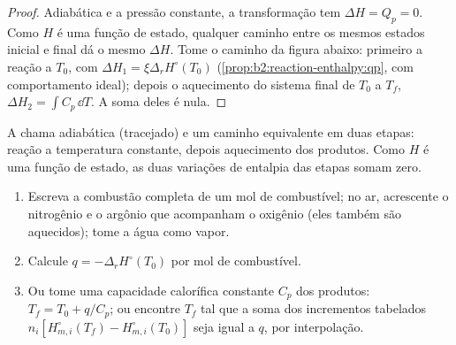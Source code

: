 \begin{proof}
Adiabática e a pressão constante, a transformação tem $\Delta H =
Q_p = 0$. Como $H$ é uma função de estado, qualquer caminho entre os mesmos
estados inicial e final dá o mesmo $\Delta H$. Tome o caminho da
figura abaixo: primeiro a reação a $T_0$, com
$\Delta H_1 = \xi\Delta_r H^\circ(T_0)$ (\cref{prop:b2:reaction-enthalpy:qp},
com comportamento ideal); depois o aquecimento do sistema final de $T_0$ a
$T_f$, $\Delta H_2 = \int C_p\,\dd T$. A soma deles é nula.
\end{proof}

\begin{omfigure}

{\small A chama adiabática (tracejado) e um caminho equivalente em duas
etapas: reação a temperatura constante, depois aquecimento dos produtos.
Como $H$ é uma função de estado, as duas variações de entalpia das etapas
somam zero.}
\end{omfigure}

\begin{method}\label{met:b2:reaction-enthalpy:flame-temperature}
\begin{enumerate}
  \item Escreva a combustão completa de um mol de combustível; no ar,
        acrescente o nitrogênio e o argônio que acompanham o oxigênio (eles
        também são aquecidos); tome a água como vapor.
  \item Calcule $q = -\Delta_r H^\circ(T_0)$ por mol de combustível.
  \item Ou tome uma capacidade calorífica constante $C_p$ dos produtos:
        $T_f = T_0 + q/C_p$; ou encontre $T_f$ tal que a soma dos
        incrementos tabelados $n_i[H^\circ_{m,i}(T_f) - H^\circ_{m,i}(T_0)]$
        seja igual a $q$, por interpolação.
\end{enumerate}
\end{method}


